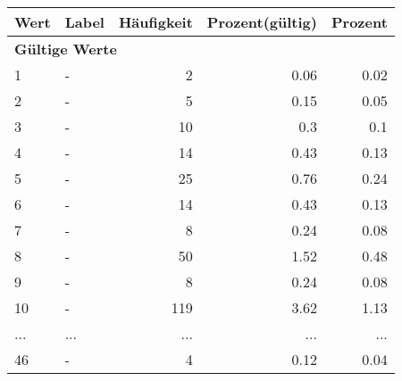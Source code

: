     \begin{longtable}{lXrrr}
     \toprule
     \textbf{Wert} & \textbf{Label} & \textbf{Häufigkeit} & \textbf{Prozent(gültig)} & \textbf{Prozent} \\
     \endhead
     \midrule
     \multicolumn{5}{l}{\textbf{Gültige Werte}}\\
        1 & \multicolumn{1}{X}{-} & %
          \num{2} &
          \num[round-mode=places,round-precision=2]{0.06} &
          \num[round-mode=places,round-precision=2]{0.02} \\
        2 & \multicolumn{1}{X}{-} & %
          \num{5} &
          \num[round-mode=places,round-precision=2]{0.15} &
          \num[round-mode=places,round-precision=2]{0.05} \\
        3 & \multicolumn{1}{X}{-} & %
          \num{10} &
          \num[round-mode=places,round-precision=2]{0.3} &
          \num[round-mode=places,round-precision=2]{0.1} \\
        4 & \multicolumn{1}{X}{-} & %
          \num{14} &
          \num[round-mode=places,round-precision=2]{0.43} &
          \num[round-mode=places,round-precision=2]{0.13} \\
        5 & \multicolumn{1}{X}{-} & %
          \num{25} &
          \num[round-mode=places,round-precision=2]{0.76} &
          \num[round-mode=places,round-precision=2]{0.24} \\
        6 & \multicolumn{1}{X}{-} & %
          \num{14} &
          \num[round-mode=places,round-precision=2]{0.43} &
          \num[round-mode=places,round-precision=2]{0.13} \\
        7 & \multicolumn{1}{X}{-} & %
          \num{8} &
          \num[round-mode=places,round-precision=2]{0.24} &
          \num[round-mode=places,round-precision=2]{0.08} \\
        8 & \multicolumn{1}{X}{-} & %
          \num{50} &
          \num[round-mode=places,round-precision=2]{1.52} &
          \num[round-mode=places,round-precision=2]{0.48} \\
        9 & \multicolumn{1}{X}{-} & %
          \num{8} &
          \num[round-mode=places,round-precision=2]{0.24} &
          \num[round-mode=places,round-precision=2]{0.08} \\
        10 & \multicolumn{1}{X}{-} & %
          \num{119} &
          \num[round-mode=places,round-precision=2]{3.62} &
          \num[round-mode=places,round-precision=2]{1.13} \\
       ... & ... & ... & ... & ... \\
        46 & \multicolumn{1}{X}{-} & %
          \num{4} &
          \num[round-mode=places,round-precision=2]{0.12} &
          \num[round-mode=places,round-precision=2]{0.04} \\


\end{longtable}
